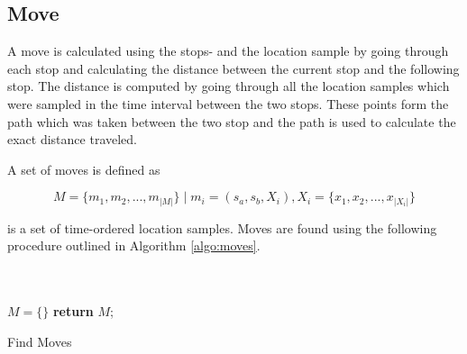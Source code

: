 \subsection{Move}
A move is calculated using the stops- and the location sample by going through each stop and calculating the distance between the current stop and the following stop. The distance is computed by going through all the location samples which were sampled in the time interval between the two stops. These points form the path which was taken between the two stop and the path is used to calculate the exact distance traveled.

A set of moves is defined as 

\begin{equation}
\label{eq:feature-moves}
M = \{m_1, m_2, ..., m_{|M|}\} \;| \; m_i = (s_a, s_b, X_i), X_i = \{x_1, x_2, ..., x_{|X_i|}\}
\end{equation}

is a set of time-ordered location samples. Moves are found using the following procedure outlined in Algorithm \ref{algo:moves}.

\begin{algorithm}[H]
\SetAlgoLined
{}\\
\\
    $M = \{ \}$\;
    \textbf{return} $M$;
 \label{algo:moves}
 \caption{Find Moves}
\end{algorithm}


